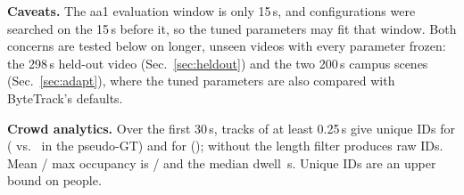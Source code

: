 \textbf{Caveats.} The aa1 evaluation window is only 15\,s, and \GridSize{} configurations were searched on the
15\,s before it, so the tuned parameters may fit that window. Both concerns are tested below on longer, unseen
videos with every parameter frozen: the 298\,s held-out video (Sec.~\ref{sec:heldout}) and the two 200\,s campus
scenes (Sec.~\ref{sec:adapt}), where the tuned parameters are also compared with ByteTrack's defaults.

\textbf{Crowd analytics.} Over the first 30\,s, tracks of at least 0.25\,s give \AnUniqueYolo{} unique IDs
for \yolo{} (\AnOverYolo{} vs.\ \AnGtUnique{} in the pseudo-GT) and \AnUniqueRf{} for \rfdetr{}
(\AnOverRf); without the length filter \yolo{} produces \AnRawYolo{} raw IDs. Mean / max occupancy is
\AnMeanYolo{} / \AnMaxYolo{} and the median dwell \AnDwellMedYolo\,s. Unique IDs are an upper bound on people.
